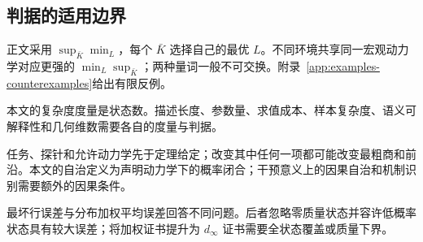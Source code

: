 \subsection{判据的适用边界}

正文采用 $\sup_{\bar K}\min_L$，每个 $\bar K$ 选择自己的最优 $L$。不同环境共享同一宏观动力学对应更强的 $\min_L\sup_{\bar K}$；两种量词一般不可交换。附录~\ref{app:examples-counterexamples}给出有限反例。

本文的复杂度度量是状态数。描述长度、参数量、求值成本、样本复杂度、语义可解释性和几何维数需要各自的度量与判据。

任务、探针和允许动力学先于定理给定；改变其中任何一项都可能改变最粗商和前沿。本文的自治定义为声明动力学下的概率闭合；干预意义上的因果自治和机制识别需要额外的因果条件。

最坏行误差与分布加权平均误差回答不同问题。后者忽略零质量状态并容许低概率状态具有较大误差；将加权证书提升为 $d_\infty$ 证书需要全状态覆盖或质量下界。
